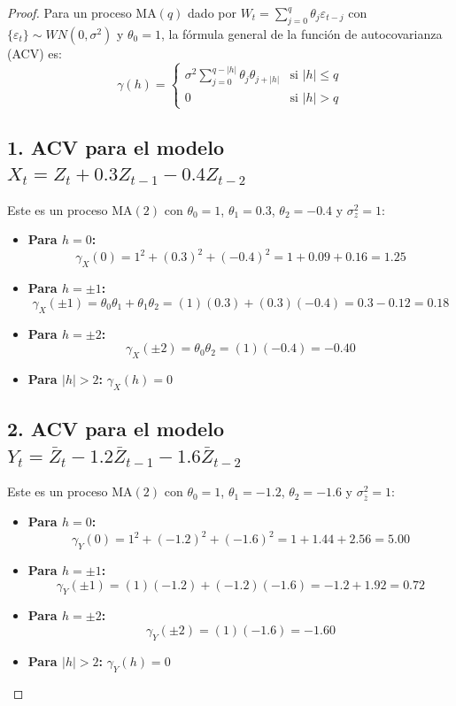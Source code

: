 \documentclass[11pt,letterpaper]{article}
\begin{document}
\begin{proof}
Para un proceso $\text{MA}(q)$ dado por $W_t = \sum_{j=0}^{q} \theta_j \varepsilon_{t-j}$ con $\{\varepsilon_t\} \sim WN(0, \sigma^2)$ y $\theta_0 = 1$, la fórmula general de la función de autocovarianza (ACV) es:
\[
\gamma(h) = 
\begin{cases} 
\sigma^2 \displaystyle\sum_{j=0}^{q - |h|} \theta_j \theta_{j+|h|} & \text{si } |h| \le q \\ 
0 & \text{si } |h| > q 
\end{cases}
\]

\subsection*{1. ACV para el modelo $X_t = Z_t + 0.3 Z_{t-1} - 0.4 Z_{t-2}$}

Este es un proceso $\text{MA}(2)$ con $\theta_0 = 1$, $\theta_1 = 0.3$, $\theta_2 = -0.4$ y $\sigma_z^2 = 1$:

\begin{itemize}
    \item \textbf{Para $h = 0$:}
    \[
    \gamma_X(0) = 1^2 + (0.3)^2 + (-0.4)^2 = 1 + 0.09 + 0.16 = 1.25
    \]
    \item \textbf{Para $h = \pm 1$:}
    \[
    \gamma_X(\pm 1) = \theta_0 \theta_1 + \theta_1 \theta_2 = (1)(0.3) + (0.3)(-0.4) = 0.3 - 0.12 = 0.18
    \]
    \item \textbf{Para $h = \pm 2$:}
    \[
    \gamma_X(\pm 2) = \theta_0 \theta_2 = (1)(-0.4) = -0.40
    \]
    \item \textbf{Para $|h| > 2$:} $\gamma_X(h) = 0$
\end{itemize}

\subsection*{2. ACV para el modelo $Y_t = \bar{Z}_t - 1.2 \bar{Z}_{t-1} - 1.6 \bar{Z}_{t-2}$}

Este es un proceso $\text{MA}(2)$ con $\theta_0 = 1$, $\theta_1 = -1.2$, $\theta_2 = -1.6$ y $\sigma_{\bar{z}}^2 = 1$:

\begin{itemize}
    \item \textbf{Para $h = 0$:}
    \[
    \gamma_Y(0) = 1^2 + (-1.2)^2 + (-1.6)^2 = 1 + 1.44 + 2.56 = 5.00
    \]
    \item \textbf{Para $h = \pm 1$:}
    \[
    \gamma_Y(\pm 1) = (1)(-1.2) + (-1.2)(-1.6) = -1.2 + 1.92 = 0.72
    \]
    \item \textbf{Para $h = \pm 2$:}
    \[
    \gamma_Y(\pm 2) = (1)(-1.6) = -1.60
    \]
    \item \textbf{Para $|h| > 2$:} $\gamma_Y(h) = 0$
\end{itemize}


\end{proof}
\end{document}
